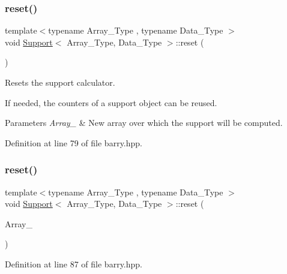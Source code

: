 \subsubsection{\texorpdfstring{reset()}{reset()}\hspace{0.1cm}{\footnotesize\ttfamily [1/2]}}
{\footnotesize\ttfamily template$<$typename Array\+\_\+\+Type , typename Data\+\_\+\+Type $>$ \\
void \hyperlink{classbarry_1_1_support}{Support}$<$ Array\+\_\+\+Type, Data\+\_\+\+Type $>$\+::reset (\begin{DoxyParamCaption}{ }\end{DoxyParamCaption})\hspace{0.3cm}{\ttfamily [inline]}}



Resets the support calculator. 

If needed, the counters of a support object can be reused.


\begin{DoxyParams}{Parameters}
{\em Array\+\_\+} & New array over which the support will be computed. \\
\hline
\end{DoxyParams}


Definition at line 79 of file barry.\+hpp.

\mbox{\label{classbarry_1_1_support_afbe207cc2762bc698c9ccb3212e9de78}} 
\subsubsection{\texorpdfstring{reset()}{reset()}\hspace{0.1cm}{\footnotesize\ttfamily [2/2]}}
{\footnotesize\ttfamily template$<$typename Array\+\_\+\+Type , typename Data\+\_\+\+Type $>$ \\
void \hyperlink{classbarry_1_1_support}{Support}$<$ Array\+\_\+\+Type, Data\+\_\+\+Type $>$\+::reset (\begin{DoxyParamCaption}\item[{const Array\+\_\+\+Type $\ast$}]{Array\+\_\+ }\end{DoxyParamCaption})\hspace{0.3cm}{\ttfamily [inline]}}



Definition at line 87 of file barry.\+hpp.



